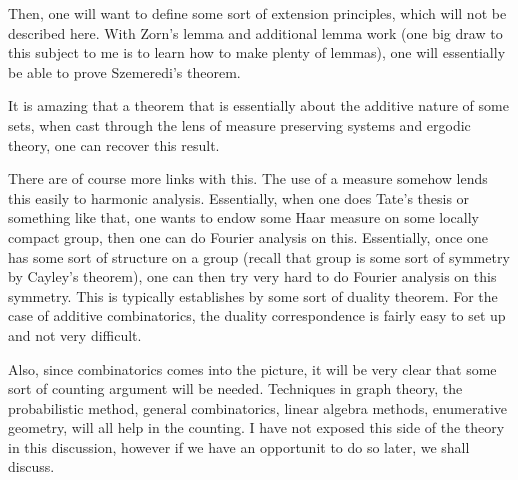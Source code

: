 \documentclass[12pt]{article}
\begin{document}
Then, one will want to define some sort of extension principles, which will not be described here. With Zorn's lemma and additional lemma work (one big draw to this subject to me is to learn how to make plenty of lemmas), one will essentially be able to prove Szemeredi's theorem.

It is amazing that a theorem that is essentially about the additive nature of some sets, when cast through the lens of measure preserving systems and ergodic theory, one can recover this result.

There are of course more links with this. The use of a measure somehow lends this easily to harmonic analysis. Essentially, when one does Tate's thesis or something like that, one wants to endow some Haar measure on some locally compact group, then one can do Fourier analysis on this. Essentially, once one has some sort of structure on a group (recall that group is some sort of symmetry by Cayley's theorem), one can then try very hard to do Fourier analysis on this symmetry. This is typically establishes by some sort of duality theorem. For the case of additive combinatorics, the duality correspondence is fairly easy to set up and not very difficult.

Also, since combinatorics comes into the picture, it will be very clear that some sort of counting argument will be needed. Techniques in graph theory, the probabilistic method, general combinatorics, linear algebra methods, enumerative geometry, will all help in the counting. I have not exposed this side of the theory in this discussion, however if we have an opportunit to do so later, we shall discuss.
\end{document}
